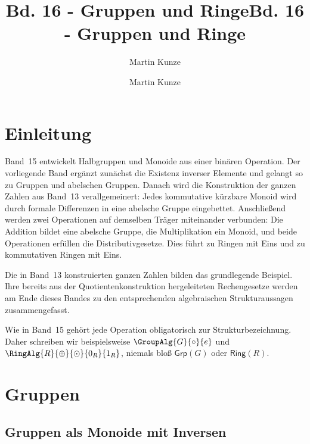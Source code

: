 \documentclass[main.tex]{subfiles}
\title{Bd. 16 - Gruppen und Ringe}
\author{Martin Kunze}
\date{}
\begin{document}
\title{Bd. 16 - Gruppen und Ringe}
\author{Martin Kunze}
\date{}
\hypersetup{pageanchor=false}
\maketitle
\hypersetup{pageanchor=true}
\setcounter{tocdepth}{3}
\tableofcontents
\setcounter{file}{16}
\renewcommand{\FormulaBandID}{16}

\chapter{Einleitung}

Band~15 entwickelt Halbgruppen und Monoide aus einer binären Operation.
Der vorliegende Band ergänzt zunächst die Existenz inverser Elemente und
gelangt so zu Gruppen und abelschen Gruppen. Danach wird die Konstruktion
der ganzen Zahlen aus Band~13 verallgemeinert: Jedes kommutative kürzbare
Monoid wird durch formale Differenzen in eine abelsche Gruppe eingebettet.
Anschließend werden zwei Operationen auf demselben Träger miteinander
verbunden: Die Addition bildet eine abelsche Gruppe, die Multiplikation ein
Monoid, und beide Operationen erfüllen die Distributivgesetze. Dies führt zu
Ringen mit Eins und zu kommutativen Ringen mit Eins.

Die in Band~13 konstruierten ganzen Zahlen bilden das grundlegende Beispiel.
Ihre bereits aus der Quotientenkonstruktion hergeleiteten Rechengesetze
werden am Ende dieses Bandes zu den entsprechenden algebraischen
Strukturaussagen zusammengefasst.

Wie in Band~15 gehört jede Operation obligatorisch zur
Strukturbezeichnung. Daher schreiben wir beispielsweise
\(\GroupAlg{G}{\circ}{e}\) und
\(\RingAlg{R}{\oplus}{\odot}{0_R}{1_R}\), niemals bloß
\(\mathsf{Grp}(G)\) oder \(\mathsf{Ring}(R)\).

\chapter{Gruppen}

\section{Gruppen als Monoide mit Inversen}

\end{document}
